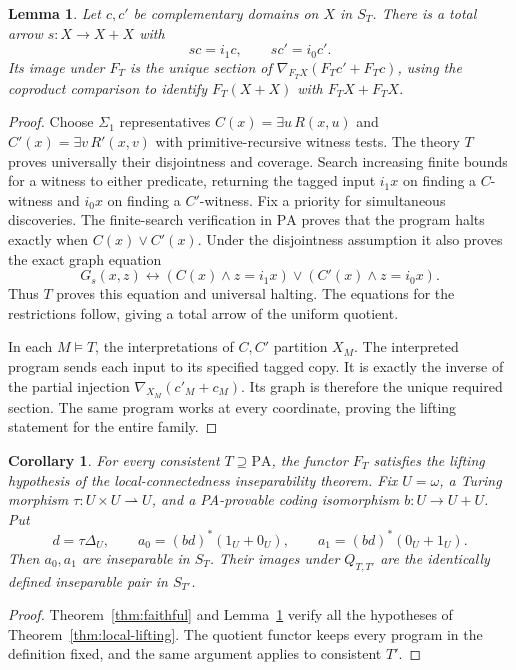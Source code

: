 \documentclass[11pt]{article}
\newtheorem{lemma}[theorem]{Lemma}
\newtheorem{corollary}[theorem]{Corollary}
\newcommand{\PA}{\mathrm{PA}}
\begin{document}
\begin{lemma}\label{lem:switch}
Let $c,c'$ be complementary domains on $X$ in $S_T$. There is a total
arrow $s:X\to X+X$ with
\[
 sc=i_1c,\qquad sc'=i_0c'.
\]
Its image under $F_T$ is the unique section of
$\nabla_{F_TX}(F_Tc'+F_Tc)$, using the coproduct comparison to identify
$F_T(X+X)$ with $F_TX+F_TX$.
\end{lemma}
\begin{proof}
Choose $\Sigma_1$ representatives $C(x)=\exists u\,R(x,u)$ and
$C'(x)=\exists v\,R'(x,v)$ with primitive-recursive witness tests.
The theory $T$ proves universally their disjointness and coverage.
Search increasing finite bounds for a witness to either predicate,
returning the tagged input $i_1x$ on finding a $C$-witness and $i_0x$
on finding a $C'$-witness. Fix a priority for simultaneous discoveries.
The finite-search verification in $\PA$ proves that the program halts
exactly when $C(x)\lor C'(x)$. Under the disjointness assumption it also
proves the exact graph equation
\[
 G_s(x,z)\leftrightarrow
 (C(x)\land z=i_1x)\lor(C'(x)\land z=i_0x).
\]
Thus $T$ proves this equation and universal halting. The equations for
the restrictions follow, giving a total arrow of the uniform quotient.

In each $M\models T$, the interpretations of $C,C'$ partition $X_M$.
The interpreted program sends each input to its specified tagged copy.
It is exactly the inverse of the partial injection
$\nabla_{X_M}(c'_M+c_M)$. Its graph is therefore the unique required
section. The same program works at every coordinate, proving the lifting
statement for the entire family.
\end{proof}

\begin{corollary}\label{cor:pair}
For every consistent $T\supseteq\PA$, the functor $F_T$ satisfies the
lifting hypothesis of the local-connectedness inseparability theorem.
Fix $U=\omega$, a Turing morphism $\tau:U\times U\rightharpoonup U$,
and a PA-provable coding isomorphism $b:U\to U+U$. Put
\[
 d=\tau\Delta_U,\qquad
 a_0=(bd)^*(1_U+0_U),\qquad a_1=(bd)^*(0_U+1_U).
\]
Then $a_0,a_1$ are inseparable in $S_T$. Their images under
$Q_{T,T'}$ are the identically defined inseparable pair in $S_{T'}$.
\end{corollary}
\begin{proof}
Theorem~\ref{thm:faithful} and Lemma~\ref{lem:switch} verify all the
hypotheses of Theorem~\ref{thm:local-lifting}. The quotient functor keeps
every program in the definition fixed, and the same argument applies
to consistent $T'$.
\end{proof}
\end{document}
